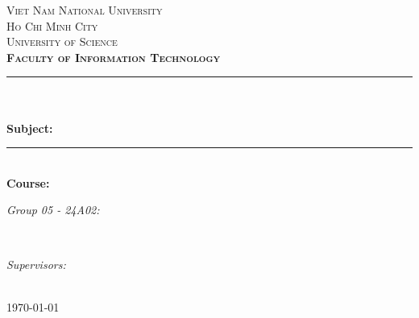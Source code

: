 \begin{titlepage}
\newcommand{\HRule}{\rule{\linewidth}{0.5mm}}
\centering

\textsc{\LARGE Viet Nam National University}\\[0.5cm]
\textsc{\LARGE Ho Chi Minh City}\\[0.5cm]
\textsc{\Large University of Science}\\[0.5cm]
\textsc{\large \textbf{Faculty of Information Technology}}\\[0.5cm]

\HRule \\[0.4cm]
{ 
\huge{\bfseries{\reporttitle}}\\[0.5cm]
\large{\bfseries{Subject: \reportname}}
}\\[0.4cm]
\HRule \\[0.5cm]

\textbf{\large Course: \coursename}\\[0.5cm]

\begin{minipage}[t]{0.5\textwidth} %
\begin{flushleft} \large
\emph{Group 05 - 24A02:}\\
\studentname
\end{flushleft}
\end{minipage}
~
\begin{minipage}[t]{0.4\textwidth} %
\begin{flushright} \large
\emph{Supervisors:} \\
\teachername
\end{flushright}
\end{minipage}\\[1cm]

{\large \today}\\[1cm]


\vfill
\end{titlepage}
